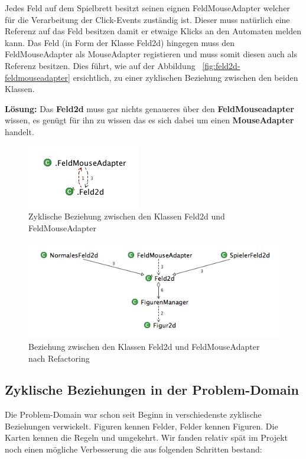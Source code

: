 \documentclass[12pt,halfparskip]{scrartcl}
\begin{document}
Jedes Feld auf dem Spielbrett besitzt seinen eignen FeldMouseAdapter welcher für die Verarbeitung der Click-Events zuständig ist. Dieser muss natürlich eine Referenz auf das Feld besitzen damit er etwaige Klicks an den Automaten melden kann. Das Feld (in Form der Klasse Feld2d) hingegen muss den FeldMouseAdapter als MouseAdapter registieren und muss somit diesen auch als Referenz besitzen. Dies führt, wie auf der Abbildung ~\vref{fig:feld2d-feldmouseadapter} ersichtlich, zu einer zyklischen Beziehung zwischen den beiden Klassen. 

\textbf{Lösung:} Das \textbf{Feld2d} muss gar nichts genaueres über den \textbf{FeldMouseadapter} wissen, es genügt für ihn zu wissen das es sich dabei um einen \textbf{MouseAdapter} handelt.

\begin{figure}[H]
	\centering
	\includegraphics[width=0.3 \textwidth]{../design/probleme/feld2d-feldmouseadapter}
	\caption{Zyklische Beziehung zwischen den Klassen Feld2d und FeldMouseAdapter}
	\label{fig:feld2d-feldmouseadapter}
\end{figure}

\begin{figure}[H]
	\centering
	\includegraphics[width=0.8 \textwidth]{../design/probleme/feld2d-feldmouseadapter-nachher}
	\caption{Beziehung zwischen den Klassen Feld2d und FeldMouseAdapter nach Refactoring}
	\label{fig:feld2d-feldmouseadapter-nachher}
\end{figure}


\subsection{Zyklische Beziehungen in der Problem-Domain}
Die Problem-Domain war schon seit Beginn in verschiedenste zyklische Beziehungen verwickelt. Figuren kennen Felder, Felder kennen Figuren. Die Karten kennen die Regeln und umgekehrt. Wir fanden relativ spät im Projekt noch einen mögliche Verbesserung die aus folgenden Schritten bestand:
\end{document}
